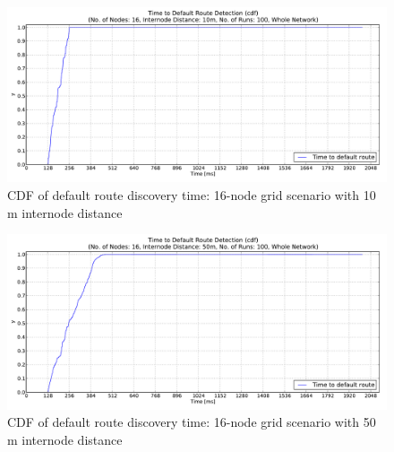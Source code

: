 \begin{figure}[htpb]
  \begin{center}
   \vspace{-20pt}
    \leavevmode
      \includegraphics[scale=0.38]
      {Pics/results/16/MRHOF/grid/dist10_montecarlo_cdf_hist.pdf}
   \caption{CDF of default route discovery time: 16-node grid scenario with 10 m internode distance}
   \label{fig:16_MRHOF_grid_10_cdf}
  \end{center}
\end{figure}

\begin{figure}[htpb]
  \begin{center}
   \vspace{-20pt}
    \leavevmode
      \includegraphics[scale=0.38]
      {Pics/results/16/MRHOF/grid/dist50_montecarlo_cdf_hist.pdf}
   \caption{CDF of default route discovery time: 16-node grid scenario with 50 m internode distance}
   \label{fig:16_MRHOF_grid_50_cdf}
  \end{center}
\end{figure}

